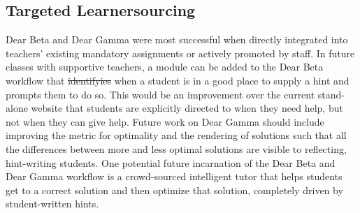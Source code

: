 \documentclass[12pt,twoside]{mitthesis}
\providecommand{\DIFaddtex}[1]{{\protect\color{blue}\uwave{#1}}} %
\providecommand{\DIFdeltex}[1]{{\protect\color{red}\sout{#1}}}                      %
\providecommand{\DIFaddbegin}{} %
\providecommand{\DIFaddend}{} %
\providecommand{\DIFdelbegin}{} %
\providecommand{\DIFdelend}{} %
\providecommand{\DIFadd}[1]{\texorpdfstring{\DIFaddtex{#1}}{#1}} %
\providecommand{\DIFdel}[1]{\texorpdfstring{\DIFdeltex{#1}}{}} %
\begin{document}
\subsection{Targeted Learnersourcing}

Dear Beta and Dear Gamma were most successful when directly integrated into teachers' existing mandatory assignments or actively promoted by staff. In future classes with supportive teachers, a module can be added to the Dear Beta workflow that \DIFdelbegin \DIFdel{identifyies }\DIFdelend \DIFaddbegin \DIFadd{identifies }\DIFaddend when a student is in a good place to supply a hint and prompts them to do so. This would be an improvement over the current stand-alone website that students are explicitly directed to when they need help, but not when they can give help. Future work on Dear Gamma should include improving the metric for optimality and the rendering of solutions such that all the differences between more and less optimal solutions are visible to reflecting, hint-writing students. One potential future incarnation of the Dear Beta and Dear Gamma workflow is a crowd-sourced intelligent tutor that helps students get to a correct solution and then optimize that solution, completely driven by student-written hints. %




%
%
%
%
\end{document}
